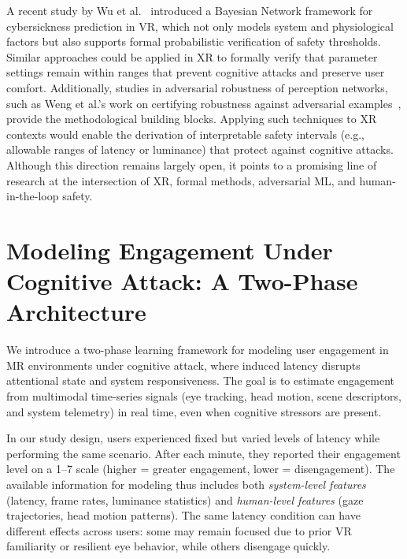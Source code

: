 \documentclass[review]{vgtc}                 %
\begin{document}
A recent study by Wu et al.~\cite{wu2025bn} introduced a Bayesian Network framework for
cybersickness prediction in VR, which not only models system and physiological factors but also
supports formal probabilistic verification of safety thresholds. Similar approaches could be
applied in XR to formally verify that parameter settings remain within ranges that prevent
cognitive attacks and preserve user comfort. Additionally, studies in adversarial robustness of perception networks, such as Weng et al.’s work on certifying robustness against adversarial examples~\cite{weng2018towards}, provide the methodological
building blocks. Applying such techniques to XR contexts would enable the derivation of interpretable safety intervals (e.g., allowable ranges of latency or luminance) that protect against cognitive attacks. Although this direction remains largely open, it points to a promising line of research at
the intersection of XR, formal methods, adversarial ML, and human-in-the-loop safety.




\section{Modeling Engagement Under Cognitive Attack: A Two-Phase Architecture}

We introduce a two-phase learning framework for modeling user engagement in MR environments under cognitive attack, where induced latency disrupts attentional state and system responsiveness. The goal is to estimate engagement from multimodal time-series signals (eye tracking, head motion, scene descriptors, and system telemetry) in real time, even when cognitive stressors are present. 

In our study design, users experienced fixed but varied levels of latency while performing the same scenario. After each minute, they reported their engagement level on a 1--7 scale (higher = greater engagement, lower = disengagement). The available information for modeling thus includes both \emph{system-level features} (latency, frame rates, luminance statistics) and \emph{human-level features} (gaze trajectories, head motion patterns). The same latency condition can have different effects across users: some may remain focused due to prior VR familiarity or resilient eye behavior, while others disengage quickly.
\end{document}
